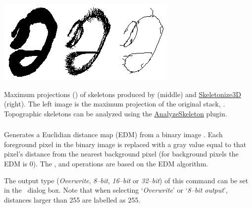 \begin{infobox}
{\small }%
\begin{minipage}[c][1\totalheight][t]{0.454\columnwidth}%
{\small \includegraphics[scale=0.55]{images/Skeletonize3D}}%
\end{minipage}{\small }%
\begin{minipage}[c][1\totalheight][t]{0.546\columnwidth}%
{\small Maximum projections ()
of skeletons produced by 
(middle) and }\href{http://fiji.sc/wiki/index.php/Skeletonize3D}{Skeletonize3D}{\small{}
(right). The left image is the maximum projection of the original
stack, .
Topographic skeletons can be analyzed using the }\href{http://fiji.sc/wiki/index.php/AnalyzeSkeleton}{AnalyzeSkeleton}
plugin.%
\end{minipage} 
\end{infobox}



\subsubsection{\protect{}\label{sub:Distance-Map}}

Generates a Euclidian
distance map (EDM) from a binary image \cite{Leymarie199284}. Each
foreground pixel in the binary image is replaced with a gray value
equal to that pixel's distance from the nearest background pixel (for
background pixels the EDM is 0). The ,
 and 
operations are based on the EDM algorithm.

The output type (\emph{Overwrite}, \emph{8--bit}, \emph{16--bit} or
\emph{32--bit}) of this command can be set in the \ dialog
box. Note that when selecting `\emph{Overwrite}' or `\emph{8--bit
output}', distances larger than 255 are labelled as 255.


